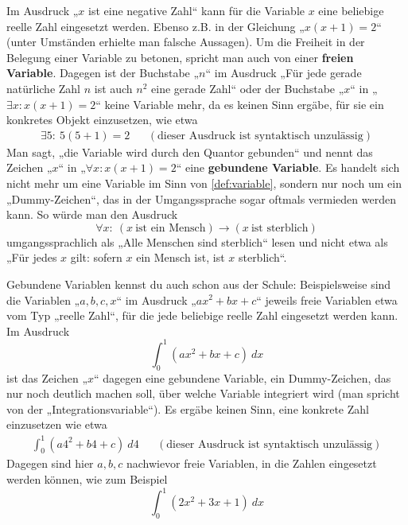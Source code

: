 \begin{bem} \label{gebundenevariable}  
    Im Ausdruck „$x$ ist eine negative Zahl“ kann für die Variable $x$ eine beliebige reelle Zahl eingesetzt werden. Ebenso z.B. in der Gleichung „$x(x+1)=2$“ (unter Umständen erhielte man falsche Aussagen). Um die Freiheit in der Belegung einer Variable zu betonen, spricht man auch von einer \textbf{freien Variable}. Dagegen ist der Buchstabe „$n$“ im Ausdruck „Für jede gerade natürliche Zahl $n$ ist auch $n^2$ eine gerade Zahl“ oder der Buchstabe „$x$“ in „$\exists x: x(x+1)=2$“ keine Variable mehr, da es keinen Sinn ergäbe, für sie ein konkretes Objekt einzusetzen, wie etwa
    \begin{align*}
        \exists 5:\ 5(5+1) = 2 && (\text{dieser Ausdruck ist syntaktisch unzulässig})
    \end{align*}
    Man sagt, „die Variable wird durch den Quantor gebunden“ und nennt das Zeichen „$x$“ in „$\forall x: x(x+1)=2$“ eine \textbf{gebundene Variable}. Es handelt sich nicht mehr um eine Variable im Sinn von \cref{def:variable}, sondern nur noch um ein „Dummy-Zeichen“, das in der Umgangssprache sogar oftmals vermieden werden kann. So würde man den Ausdruck
        \[ \forall x:\ (x\ \text{ist ein Mensch})\to (x\ \text{ist sterblich}) \]
    umgangssprachlich als „Alle Menschen sind sterblich“ lesen und nicht etwa als „Für jedes $x$ gilt: sofern $x$ ein Mensch ist, ist $x$ sterblich“.
    
    Gebundene Variablen kennst du auch schon aus der Schule: Beispielsweise sind die Variablen „$a,b,c,x$“ im Ausdruck „$ax^2 +bx+c$“ jeweils freie Variablen etwa vom Typ „reelle Zahl“, für die jede beliebige reelle Zahl eingesetzt werden kann. Im Ausdruck
        \[ \int_0^1 (ax^2+bx+c)\ dx \]
    ist das Zeichen „$x$“ dagegen eine gebundene Variable, ein Dummy-Zeichen, das nur noch deutlich machen soll, über welche Variable integriert wird (man spricht von der „Integrationsvariable“). Es ergäbe keinen Sinn, eine konkrete Zahl einzusetzen wie etwa
    \begin{align*}
        \int_0^1 (a4^2+b4+c)\ d4 && (\text{dieser Ausdruck ist syntaktisch unzulässig})
    \end{align*}
    Dagegen sind hier $a,b,c$ nachwievor freie Variablen, in die Zahlen eingesetzt werden können, wie zum Beispiel
        \[ \int_0^1 (2x^2+3x+1)\ dx\]
\end{bem}


